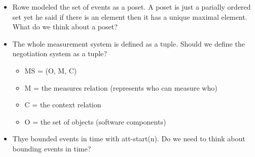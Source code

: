 \documentclass{article}
\begin{document}
\begin{itemize}
\item Rowe modeled the set of events as a poset. A poset is just a parially ordered set yet he said if there is an element then it has a unique maximal element. What do we think about a poset?
\item The whole measurement system is defined as a tuple. Should we define the negotiation system as a tuple?
  \begin{itemize}
  \item MS = (O, M, C)
  \item M = the measures relation (represents who can measure who)
  \item C = the context relation
  \item O = the set of objects (software components)
  \end{itemize}
\item Thye bounded events in time with att-start(n). Do we need to think about bounding events in time? 
\end{itemize}
\end{document}
